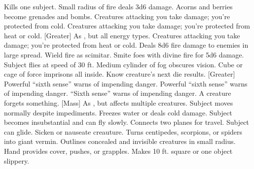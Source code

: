     {Kills one subject.}
    {Small radius of fire deals 3d6 damage.}
    {Acorns and berries become grenades and bombs.}
    {Creatures attacking you take damage; you're protected from cold.}
    {Creatures attacking you take damage; you're protected from heat or cold.  [Greater] As , but all energy types.}
    {Creatures attacking you take damage; you're protected from heat or cold.}
    {Deals 8d6 fire damage to enemies in large spread.}
    {Wield fire as scimitar.}
    {Smite foes with divine fire for 5d6 damage.}
    {Subject flies at speed of 30 ft.}
    {Medium cylinder of fog obscures vision.}
    {Cube or cage of force imprisons all inside.}
    {Know creature's next die results.}
[Greater]
    {Powerful ``sixth sense'' warns of impending danger.}
    {Powerful ``sixth sense'' warns of impending danger.}
    {``Sixth sense'' warns of impending danger.}
    {A creature forgets something.}
[Mass]
    {As , but affects multiple creatures.}
    {Subject moves normally despite impediments.}
    {Freezes water or deals cold damage.}
    {Subject becomes insubstantial and can fly slowly.}
    {Connects two planes for travel.}
    {Subject can glide.}
    {Sicken or nauseate creauture.}
    {Turns centipedes, scorpions, or spiders into giant vermin.}
    {Outlines concealed and invisible creatures in small radius.}
    {Hand provides cover, pushes, or grapples.}
    {Makes 10 ft. square or one object slippery.}
